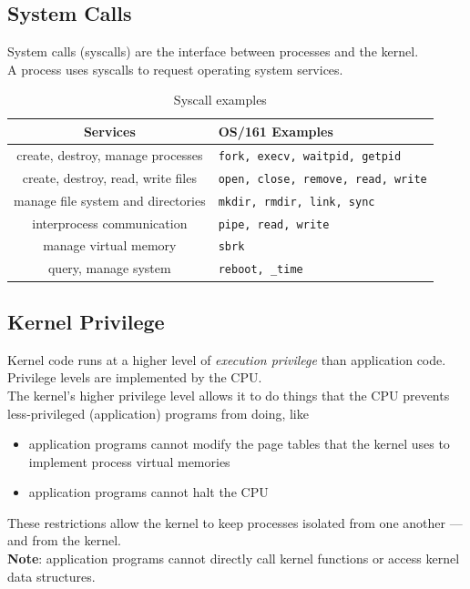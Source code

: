 \documentclass[12pt]{article}
\theoremstyle{plain}
\theoremstyle{definition}
\begin{document}
\subsection{System Calls}
System calls (syscalls) are the interface between processes and the kernel. \\
A process uses syscalls to request operating system services.
\begin{table}[ht]
  \caption{Syscall examples}
  \label{tab:ex_syscall}
  \centering
  \begin{tabular}{c|l}
  Services & OS/161 Examples \\ \hline
  create, destroy, manage processes & \texttt{fork, execv, waitpid, getpid} \\
  create, destroy, read, write files & \texttt{open, close, remove, read, write} \\
  manage file system and directories & \texttt{mkdir, rmdir, link, sync} \\
  interprocess communication & \texttt{pipe, read, write} \\
  manage virtual memory & \texttt{sbrk} \\
  query, manage system & \texttt{reboot, \_time}
  \end{tabular}
\end{table}

\subsection{Kernel Privilege}
Kernel code runs at a higher level of \emph{execution privilege} than application code. \\
Privilege levels are implemented by the CPU. \\

The kernel's higher privilege level allows it to do things that the CPU prevents less-privileged (application) programs from doing, like
\begin{itemize}
  \item application programs cannot modify the page tables that the kernel uses to implement process virtual memories
  \item application programs cannot halt the CPU
\end{itemize}

These restrictions allow the kernel to keep processes isolated from one another --- and from the kernel. \\

\textbf{Note}: application programs cannot directly call kernel functions or access kernel data structures.
\end{document}
